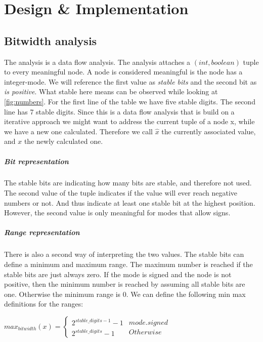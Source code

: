 \chapter{Design \& Implementation}\label{sec:impl}

\section{Bitwidth analysis}
The analysis is a data flow analysis. The analysis attaches a $(int,boolean)$ tuple to every meaningful node. A node is considered meaningful is the node has a integer-mode. We will reference the first value as \emph{stable bits} and the second bit as \emph{is positive}. \newline
What stable here means can be observed while looking at \ref{fig:numbers}.
For the first line of the table we have five stable digits. The second line has 7 stable digits.\newline
Since this is a data flow analysis that is build on a iterative approach we might want to address the current tuple of a node x, while we have a new one calculated. Therefore we call $\hat{x}$ the currently associated value, and $x$ the newly calculated one.

\paragraph{Bit representation}
The stable bits are indicating how many bits are stable, and therefore not used.
The second value of the tuple indicates if the value will ever reach negative numbers or not. And thus indicate at least one stable bit at the highest position. However, the second value is only meaningful for modes that allow signs.

\paragraph{Range representation}
There is also a second way of interpreting the two values. The stable bits can define a minimum and maximum range. The maximum number is reached if the stable bits are just always zero. If the mode is signed and the node is not positive, then the minimum number is reached by assuming all stable bits are one. Otherwise the minimum range is 0. We can define the following min max definitions for the ranges:

$
max_{bitwidth}(x)=
\left\{
\begin{array}{l}2^{stable\_digits-1}-1\\2^{stable\_digits}-1\end{array}
\begin{array}{l} {mode.signed} \\ {Otherwise} \end{array}
\right.
$

